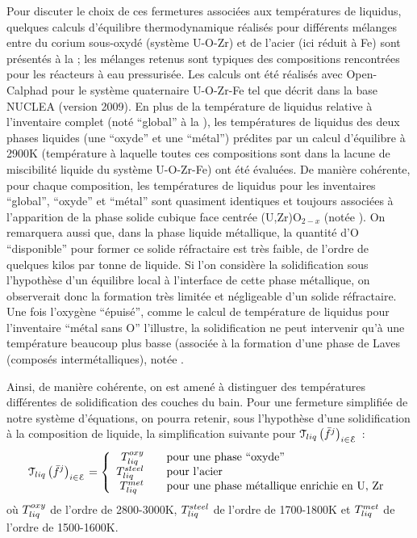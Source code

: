 Pour discuter le choix de ces fermetures associées aux températures de liquidus, quelques calculs d'équilibre thermodynamique réalisés pour différents mélanges entre du corium sous-oxydé (système U-O-Zr) et de l'acier (ici réduit à Fe) sont présentés à la  ; les mélanges retenus sont typiques des compositions rencontrées pour les réacteurs à eau pressurisée. Les calculs ont été réalisés avec Open-Calphad \cite{Sundman2015,Sundman2016} pour le système quaternaire U-O-Zr-Fe tel que décrit dans la base NUCLEA \cite{Cheynet2002} (version 2009). En plus de la température de liquidus relative à l'inventaire complet (noté ``global'' à la ), les températures de liquidus des deux phases liquides (une ``oxyde'' et une ``métal'') prédites par un calcul d'équilibre à 2900K (température à laquelle toutes ces compositions sont dans la lacune de miscibilité liquide du système U-O-Zr-Fe) ont été évaluées. De manière cohérente, pour chaque composition, les températures de liquidus pour les inventaires ``global'', ``oxyde'' et ``métal'' sont quasiment identiques et toujours associées à l'apparition de la phase solide cubique face centrée (U,Zr)O$_{2-x}$ (notée ). On remarquera aussi que, dans la phase liquide métallique, la quantité d'O ``disponible'' pour former ce solide réfractaire est très faible, de l'ordre de quelques kilos par tonne de liquide. Si l'on considère la solidification sous l'hypothèse d'un équilibre local à l'interface de cette phase métallique, on observerait donc la formation très limitée et négligeable d'un solide réfractaire. Une fois l'oxygène ``épuisé'', comme le calcul de température de liquidus pour l'inventaire ``métal sans O'' l'illustre, la solidification ne peut intervenir qu'à une température beaucoup plus basse (associée à la formation d'une phase de Laves (composés intermétalliques), notée .

Ainsi, de manière cohérente, on est amené à distinguer des températures différentes de solidification des couches du bain. Pour une fermeture simplifiée de notre système d'équations, on pourra retenir, sous l'hypothèse d'une solidification à la composition de liquide, la simplification suivante pour $\Mc{T}_{liq}\left(\elementMassFraction[j]{}\right)_{i\in\elementSet}$ :
\begin{equation}
 \Mc{T}_{liq}\left(\elementMassFraction[j]{}\right)_{i\in\elementSet} = 
 \left\{\begin{array}{rcl} \temperature[oxy]{liq} & & \text{pour une phase ``oxyde''} \\
                           \temperature[steel]{liq} & & \text{pour l'acier} \\
                           \temperature[met]{liq} & & \text{pour une phase métallique enrichie en U, Zr} 
 \end{array}\right.
\end{equation}
où $\temperature[oxy]{liq}$ de l'ordre de 2800-3000K, $\temperature[steel]{liq}$ de l'ordre de 1700-1800K et $\temperature[met]{liq}$ de l'ordre de 1500-1600K.

